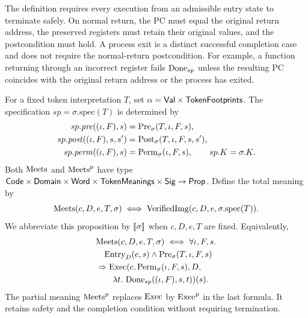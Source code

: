 The definition requires every execution from an admissible entry state to terminate safely. On normal return, the PC must equal the original return address, the preserved registers must retain their original values, and the postcondition must hold. A process exit is a distinct successful completion case and does not require the normal-return postcondition. For example, a function returning through an incorrect register fails $\mathrm{Done}_{sp}$ unless the resulting PC coincides with the original return address or the process has exited.


\begin{definition}\label{def:meets}
For a fixed token interpretation $T$, set $\alpha=\mathsf{Val}\times\mathsf{TokenFootprints}$. The specification $sp=\sigma.\mathrm{spec}(T)$ is determined by
\[
\begin{aligned}
sp.\mathit{pre}((\iota,F),s)&=\mathrm{Pre}_\sigma(T,\iota,F,s),\\
sp.\mathit{post}((\iota,F),s,s')&=\mathrm{Post}_\sigma(T,\iota,F,s,s'),\\
sp.\mathit{perm}((\iota,F),s)&=\mathrm{Perm}_\sigma(\iota,F,s),\qquad sp.K=\sigma.K.
\end{aligned}
\]
Both $\mathrm{Meets}$ and $\mathrm{Meets}^{\mathrm{p}}$ have type $\mathsf{Code}\times\mathsf{Domain}\times\mathsf{Word}\times\mathsf{TokenMeanings}\times\mathsf{Sig}\to\mathsf{Prop}$. Define the total meaning by
\[\mathrm{Meets}(c,D,e,T,\sigma)\iff\mathrm{VerifiedImg}(c,D,e,\sigma.\mathrm{spec}(T)).\]
We abbreviate this proposition by $[\![\sigma]\!]$ when $c,D,e,T$ are fixed. Equivalently,
\[
\begin{aligned}
&\mathrm{Meets}(c,D,e,T,\sigma)\iff\forall\iota,F,s.\\ &\quad\mathrm{Entry}_D(e,s)\land\mathrm{Pre}_\sigma(T,\iota,F,s)\\
&\Rightarrow\mathrm{Exec}(c,\mathrm{Perm}_\sigma(\iota,F,s),D,\\ &\qquad\lambda t.\ \mathrm{Done}_{sp}((\iota,F),s,t))(s).
\end{aligned}
\]
The partial meaning $\mathrm{Meets}^{\mathrm{p}}$ replaces $\mathrm{Exec}$ by $\mathrm{Exec}^{\mathrm p}$ in the last formula. It retains safety and the completion condition without requiring termination.
\end{definition}

